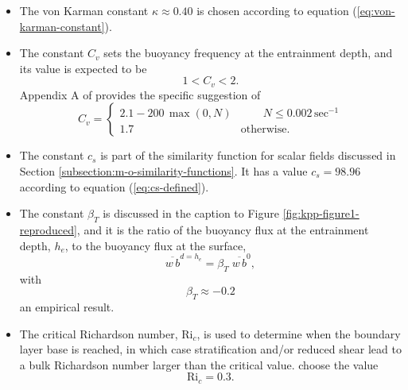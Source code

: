 \begin{itemize}

\item The von Karman constant $\kappa \approx 0.40$ is chosen
  according to equation (\ref{eq:von-karman-constant}).

\item The constant $C_{v}$ sets the buoyancy frequency at the entrainment
 depth, and its value is expected to be 
\begin{equation}
 1 < C_{v} < 2. 
\label{eq:Cv-values-given-general} 
\end{equation}
 Appendix A of \cite{Dana_etal2006} provides the specific suggestion
 of 
\begin{equation}
C_{v} =  \left\{ 
\begin{array}{lc}
  2.1 - 200 \, \max(0,N)   & \qquad N \le 0.002 \, \mbox{sec}^{-1}
\\
  1.7 & \mbox{otherwise}. 
\end{array}
\right.
\label{eq:Cv-values-given} 
\end{equation}

\item The constant $c_{s}$ is part of the similarity function for
  scalar fields discussed in Section
  \ref{subsection:m-o-similarity-functions}.  It has a value $c_{s} =
  98.96$ according to equation (\ref{eq:cs-defined}).

\item The constant $\beta_{T}$ is discussed in the caption to Figure
  \ref{fig:kpp-figure1-reproduced}, and it is the ratio of the
  buoyancy flux at the entrainment depth, $h_{e}$, to the buoyancy
  flux at the surface,
\begin{equation}
 \overline{w \, b}^{d=h_{e}} = \beta_{T}   \; \overline{w \, b}^{0},
\end{equation}
 with 
\begin{equation}
 \beta_{T} \approx -0.2
\end{equation}
an empirical result.  

\item The critical Richardson number, $\mbox{Ri}_{c}$, is used to
  determine when the boundary layer base is reached, in which case
  stratification and/or reduced shear lead to a bulk Richardson number
  larger than the critical value.  \cite{LargeKPP} choose the value
\begin{equation}
 \mbox{Ri}_{c} = 0.3.  
\label{eq:large-critical-bulk-ri}
\end{equation}


\end{itemize}
